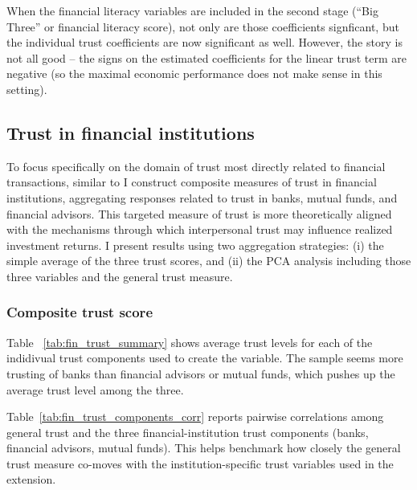 \label{tab:finlit_r5_panel3}
\FloatBarrier

\par When the financial literacy variables are included in the second stage (``Big Three'' or financial literacy score), not only are those coefficients signficant, but the individual trust coefficients are now significant as well. However, the story is not all good -- the signs on the estimated coefficients for the linear trust term are negative (so the maximal economic performance does not make sense in this setting).

\subsection{Trust in financial institutions}

\par To focus specifically on the domain of trust most directly related to financial transactions, similar to \cite{Rosen2025} I construct composite measures of trust in financial institutions, aggregating responses related to trust in banks, mutual funds, and financial advisors. This targeted measure of trust is more theoretically aligned with the mechanisms through which interpersonal trust may influence realized investment returns. I present results using two aggregation strategies: (i) the simple average of the three trust scores, and (ii) the PCA analysis including those three variables and the general trust measure.

\subsubsection{Composite trust score}

\par Table ~\ref{tab:fin_trust_summary} shows average trust levels for each of the indidivual trust components used to create the  variable. The sample seems more trusting of banks than financial advisors or mutual funds, which pushes up the average trust level among the three. 

\label{tab:fin_trust_summary}
\FloatBarrier

\par Table~\ref{tab:fin_trust_components_corr} reports pairwise correlations among general trust and the three financial-institution trust components (banks, financial advisors, mutual funds). This helps benchmark how closely the general trust measure co-moves with the institution-specific trust variables used in the extension.

